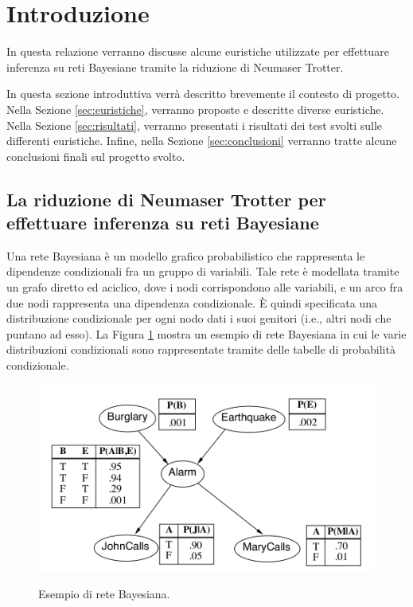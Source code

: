 \section{Introduzione}
\label{sec:introduzione}


In questa relazione verranno discusse alcune euristiche utilizzate per effettuare inferenza su reti Bayesiane tramite la riduzione di Neumaser Trotter. 

In questa sezione introduttiva verrà descritto brevemente il contesto di progetto. Nella Sezione \ref{sec:euristiche}, verranno proposte e descritte diverse euristiche. Nella Sezione \ref{sec:risultati}, verranno presentati i risultati dei test svolti sulle differenti euristiche. Infine, nella Sezione \ref{sec:conclusioni} verranno tratte alcune conclusioni finali sul progetto svolto.

\subsection{La riduzione di Neumaser Trotter per effettuare inferenza su reti Bayesiane}

Una rete Bayesiana è un modello grafico probabilistico che rappresenta le dipendenze condizionali fra un gruppo di variabili. Tale rete è modellata tramite un grafo diretto ed aciclico, dove i nodi corrispondono alle variabili, e un arco fra due nodi rappresenta una dipendenza condizionale. È quindi specificata una distribuzione condizionale per ogni nodo dati i suoi genitori (i.e., altri nodi che puntano ad esso). La Figura \ref{fig:reteB} mostra un esempio di rete Bayesiana in cui le varie distribuzioni condizionali sono rappresentate tramite delle tabelle di probabilità condizionale.

\begin{figure}[htbp]
\includegraphics[width=\textwidth]{res/img/reteBayesiana.png}
\label{fig:reteB}
\caption{Esempio di rete Bayesiana.}
\end{figure}

